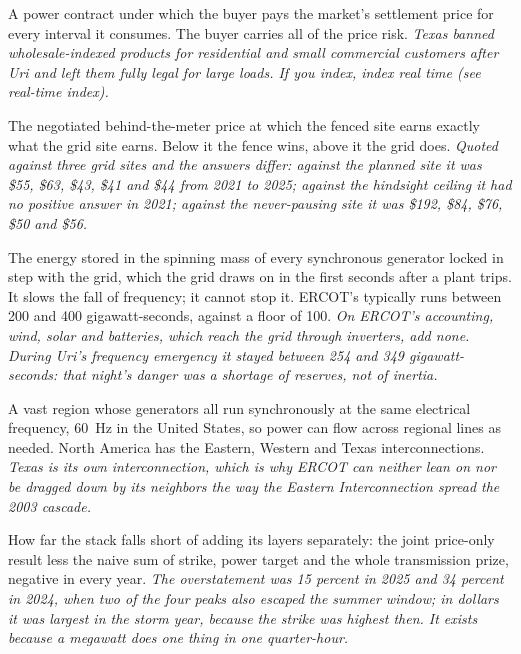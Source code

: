 \begin{description}[leftmargin=0pt,style=unboxed,itemsep=0.35em,parsep=0.15em]
\item[index contract] \hypertarget{glossary:index-contract}{}A power contract under which the buyer pays the market's settlement price for every interval it consumes. The buyer carries all of the price risk. \emph{Texas banned wholesale-indexed products for residential and small commercial customers after Uri and left them fully legal for large loads. If you index, index real time (see real-time index).}
\item[indifference price] \hypertarget{glossary:indifference-price}{}The negotiated behind-the-meter price at which the fenced site earns exactly what the grid site earns. Below it the fence wins, above it the grid does. \emph{Quoted against three grid sites and the answers differ: against the planned site it was \$55, \$63, \$43, \$41 and \$44 from 2021 to 2025; against the hindsight ceiling it had no positive answer in 2021; against the never-pausing site it was \$192, \$84, \$76, \$50 and \$56.}
\item[inertia] \hypertarget{glossary:inertia}{}The energy stored in the spinning mass of every synchronous generator locked in step with the grid, which the grid draws on in the first seconds after a plant trips. It slows the fall of frequency; it cannot stop it. ERCOT's typically runs between 200 and 400 gigawatt-seconds, against a floor of 100. \emph{On ERCOT's accounting, wind, solar and batteries, which reach the grid through inverters, add none. During Uri's frequency emergency it stayed between 254 and 349 gigawatt-seconds: that night's danger was a shortage of reserves, not of inertia.}
\item[interconnection] \hypertarget{glossary:interconnection}{}A vast region whose generators all run synchronously at the same electrical frequency, 60~Hz in the United States, so power can flow across regional lines as needed. North America has the Eastern, Western and Texas interconnections. \emph{Texas is its own interconnection, which is why ERCOT can neither lean on nor be dragged down by its neighbors the way the Eastern Interconnection spread the 2003 cascade.}
\item[interference] \hypertarget{glossary:interference}{}How far the stack falls short of adding its layers separately: the joint price-only result less the naive sum of strike, power target and the whole transmission prize, negative in every year. \emph{The overstatement was 15 percent in 2025 and 34 percent in 2024, when two of the four peaks also escaped the summer window; in dollars it was largest in the storm year, because the strike was highest then. It exists because a megawatt does one thing in one quarter-hour.}

\end{description}
